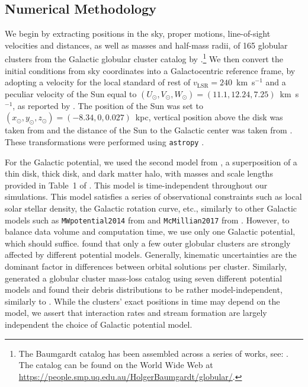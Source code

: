 \documentclass{aa}
\begin{document}
  \subsection{Numerical Methodology}
    We begin by extracting positions in the sky, proper motions, line-of-sight velocities and distances, as well as masses and half-mass radii, of 165 globular clusters from the Galactic globular cluster catalog by \cite{2021MNRAS.505.5957B}.\footnote{The Baumgardt catalog has been assembled across a series of works, see: \cite{2020PASA...37...46B,2019MNRAS.482.5138B,2018MNRAS.478.1520B}. The catalog can be found on the World Wide Web at \href{https://people.smp.uq.edu.au/HolgerBaumgardt/globular/}{https://people.smp.uq.edu.au/HolgerBaumgardt/globular/}.} We then convert the initial conditions from sky coordinates into a Galactocentric reference frame, by adopting a velocity for the local standard of rest of $v_{\text{LSR}} = 240$~km~s$^{-1}$ and a peculiar velocity of the Sun equal to $(U_\odot, V_\odot, W_\odot)=(11.1, 12.24, 7.25)$~km~s$^{-1}$, as reported by \citet{2012MNRAS.427..274S}.  The position of the Sun was set to $(x_\odot,y_\odot,z_\odot) = (-8.34,0,0.027)$~kpc, vertical position above the disk was taken from \citet{2001ApJ...553..184C} and the distance of the Sun to the Galactic center was taken from \citet{2014ApJ...783..130R}. These transformations were performed using \texttt{astropy} \citep{2013A&A...558A..33A}.

    For the Galactic potential, we used the second model from \citet{2017A&A...598A..66P}, a superposition of a thin disk, thick disk, and dark matter halo, with masses and scale lengths provided in Table~1 of \citet{2023A&A...673A..44F}. This model is time-independent throughout our simulations. This model satisfies a series of observational constraints such as local solar stellar density, the Galactic rotation curve, etc., similarly to other Galactic models such as \texttt{MWpotential2014} from \citet{2015ApJS..216...29B} and \texttt{McMillian2017} from \citet{2017MNRAS.465...76M}. However, to balance data volume and computation time, we use only one Galactic potential, which should suffice. \citet{2021MNRAS.505.5978V} found that only a few outer globular clusters are strongly affected by different potential models. Generally, kinematic uncertainties are the dominant factor in differences between orbital solutions per cluster. Similarly, \citet{2024MNRAS.528.5189G} generated a globular cluster mass-loss catalog using seven different potential models and found their debris distributions to be rather model-independent, similarly to \citet{2023A&A...673A..44F}. While the clusters' exact positions in time may depend on the model, we assert that interaction rates and stream formation are largely independent the choice of Galactic potential model.
    
\end{document}
